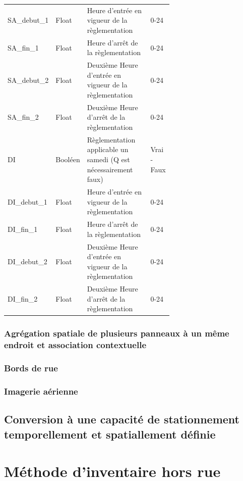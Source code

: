 \begin{longtable}{p{0.15 \linewidth}  l p{0.5\linewidth} l  }
          SA\_debut\_1 & Float & Heure d'entrée en vigueur de la règlementation & 0-24\\
          SA\_fin\_1 & Float & Heure d'arrêt de la règlementation & 0-24\\
          SA\_debut\_2 & Float & Deuxième Heure d'entrée en vigueur de la règlementation & 0-24\\
          SA\_fin\_2 & Float & Deuxième Heure d'arrêt de la règlementation & 0-24 \\
          DI & Booléen & Règlementation applicable un samedi (Q est nécessairement faux) & Vrai - Faux \\
          DI\_debut\_1 & Float & Heure d'entrée en vigueur de la règlementation & 0-24\\
          DI\_fin\_1 & Float & Heure d'arrêt de la règlementation & 0-24\\
          DI\_debut\_2 & Float & Deuxième Heure d'entrée en vigueur de la règlementation & 0-24\\
          DI\_fin\_2 & Float & Deuxième Heure d'arrêt de la règlementation & 0-24 \\  
        \end{longtable}

      \FloatBarrier
      \subsubsection{Agrégation spatiale de plusieurs panneaux à un même endroit et association contextuelle}
    \subsubsection{Bords de rue}
    \subsubsection{Imagerie aérienne}
  \subsection{Conversion à une capacité de stationnement temporellement et spatiallement définie}
\section{Méthode d'inventaire hors rue}
